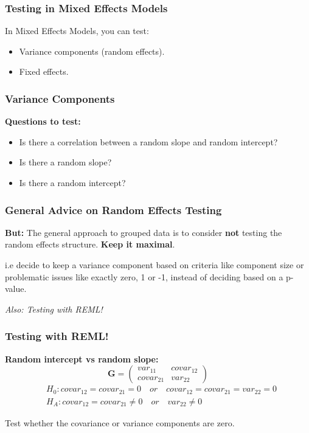 \documentclass{beamer}
\begin{document}
\begin{frame}
    \frametitle{Testing in Mixed Effects Models}
    \Large
    In Mixed Effects Models, you can test:
    \begin{itemize}
        \item Variance components (random effects).
        \item Fixed effects.
    \end{itemize}
\end{frame}

\begin{frame}
    \frametitle{Variance Components}
    \Large
    \textbf{Questions to test:}
    \begin{itemize}
        \item Is there a correlation between a random slope and random intercept?
        \item Is there a random slope?
        \item Is there a random intercept?
    \end{itemize}
\end{frame}

\begin{frame}
    \frametitle{General Advice on Random Effects Testing}
    \large
    \textbf{But:} The general approach to grouped data is to consider \textbf{not} testing the random effects structure. \textbf{Keep it maximal}.
    \vspace{0.2cm}
    
    i.e decide to keep a variance component based on criteria like component size or problematic issues like exactly zero, 1 or -1, instead of deciding based on a p-value.
    \vspace{0.2cm}
    
    \textit{Also: Testing with REML!}
    
\end{frame}

\begin{frame}
    \frametitle{Testing with REML!}
    \textbf{Random intercept vs random slope:}
    \[
    \mathbf{G} = \begin{pmatrix}
    var_{11} & covar_{12} \\
    covar_{21} & var_{22}
    \end{pmatrix}    
    \]
    \begin{align*}
     &H_0: covar_{12} = covar_{21} = 0 \quad or \quad covar_{12} = covar_{21} = var_{22} = 0\\
     &H_A: covar_{12} = covar_{21} \neq 0 \quad or \quad var_{22} \neq 0
    \end{align*}        
    
    Test whether the covariance or variance components are zero.
\end{frame}
\end{document}
